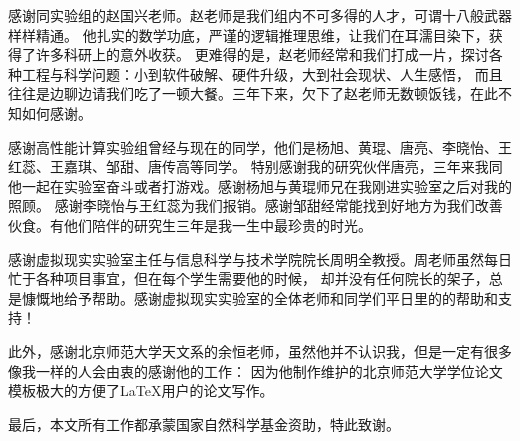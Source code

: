 \begin{ack}
感谢同实验组的赵国兴老师。赵老师是我们组内不可多得的人才，可谓十八般武器样样精通。 他扎实的数学功底，严谨的逻辑推理思维，让我们在耳濡目染下，获得了许多科研上的意外收获。 更难得的是，赵老师经常和我们打成一片，探讨各种工程与科学问题：小到软件破解、硬件升级，大到社会现状、人生感悟， 而且往往是边聊边请我们吃了一顿大餐。三年下来，欠下了赵老师无数顿饭钱，在此不知如何感谢。

感谢高性能计算实验组曾经与现在的同学，他们是杨旭、黄琨、唐亮、李晓怡、王红蕊、王嘉琪、邹甜、唐传高等同学。 特别感谢我的研究伙伴唐亮，三年来我同他一起在实验室奋斗或者打游戏。感谢杨旭与黄琨师兄在我刚进实验室之后对我的照顾。 感谢李晓怡与王红蕊为我们报销。感谢邹甜经常能找到好地方为我们改善伙食。有他们陪伴的研究生三年是我一生中最珍贵的时光。

感谢虚拟现实实验室主任与信息科学与技术学院院长周明全教授。周老师虽然每日忙于各种项目事宜，但在每个学生需要他的时候， 却并没有任何院长的架子，总是慷慨地给予帮助。感谢虚拟现实实验室的全体老师和同学们平日里的的帮助和支持！

此外，感谢北京师范大学天文系的余恒老师，虽然他并不认识我，但是一定有很多像我一样的人会由衷的感谢他的工作： 因为他制作维护的北京师范大学学位论文模板极大的方便了\LaTeX{}用户的论文写作。

最后，本文所有工作都承蒙国家自然科学基金资助，特此致谢。
\end{ack}
